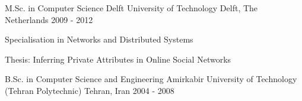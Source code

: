 

\begin{cventries}

  \cventry
    {M.Sc. in Computer Science} %
    {Delft University of Technology} %
    {Delft, The Netherlands} %
    {2009 - 2012} %
    {
      \begin{cvitems} %
        \item {Specialisation in Networks and Distributed Systems}
        \item {Thesis: Inferring Private Attributes in Online Social Networks}
      \end{cvitems}
    }

  \cventry
    {B.Sc. in Computer Science and Engineering} %
    {Amirkabir University of Technology (Tehran Polytechnic)} %
    {Tehran, Iran} %
    {2004 - 2008} %
    {}

\end{cventries}
